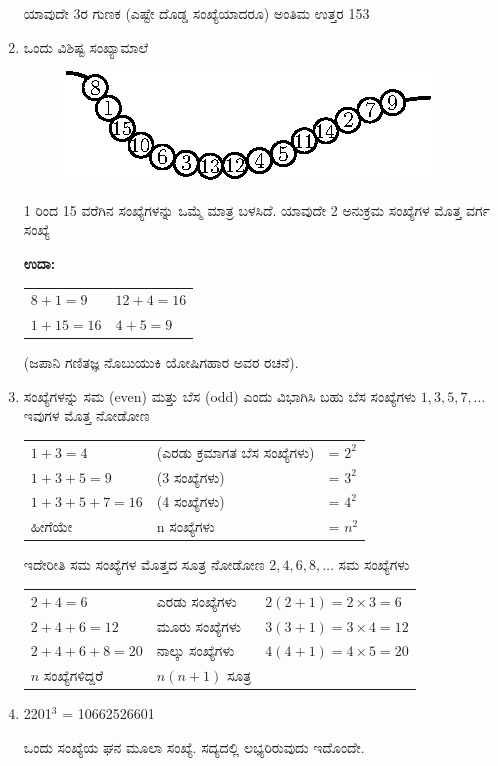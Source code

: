 \begin{enumerate}
ಯಾವುದೇ 3ರ ಗುಣಕ (ಎಷ್ಟೇ ದೊಡ್ಡ ಸಂಖ್ಯೆಯಾದರೂ) ಅಂತಿಮ ಉತ್ತರ 153

\item ಒಂದು ವಿಶಿಷ್ಟ ಸಂಖ್ಯಾಮಾಲೆ
\begin{figure}[H]
\centering
\includegraphics{images/chap1/q28.eps}
\end{figure}

1 ರಿಂದ 15 ವರೆಗಿನ ಸಂಖ್ಯೆಗಳನ್ನು ಒಮ್ಮೆ ಮಾತ್ರ ಬಳಸಿದೆ. ಯಾವುದೇ 2 ಅನುಕ್ರಮ ಸಂಖ್ಯೆಗಳ ಮೊತ್ತ ವರ್ಗ ಸಂಖ್ಯೆ

{\bf ಉದಾ:}
\begin{tabular}[t]{ll}
$8 + 1 = 9$ & $12 + 4 = 16$\\
$1 + 15 = 16$ & $4 + 5 = 9$
\end{tabular}

\hfill (ಜಪಾನಿ ಗಣಿತಜ್ಞ ನೊಬುಯುಕಿ ಯೋಷಿಗಹಾರ ಅವರ ರಚನೆ).

\item ಸಂಖ್ಯೆಗಳನ್ನು ಸಮ (even) ಮತ್ತು ಬೆಸ (odd) ಎಂದು ವಿಭಾಗಿಸಿ ಬಹು ಬೆಸ ಸಂಖ್ಯೆಗಳು $1, 3, 5, 7, \ldots$ ಇವುಗಳ ಮೊತ್ತ ನೋಡೋಣ

{\fontsize{11pt}{13pt}\selectfont
\begin{tabular}{lll}
$1 + 3 = 4$ &(ಎರಡು ಕ್ರಮಾಗತ ಬೆಸ ಸಂಖ್ಯೆಗಳು) & = $2^{2}$\\
$1 + 3 + 5 = 9$ &(3 ಸಂಖ್ಯೆಗಳು) & = $3^{2}$\\
$1 + 3 + 5 + 7 = 16$ &(4 ಸಂಖ್ಯೆಗಳು) & = $4^{2}$\\
ಹೀಗೆಯೇ & n ಸಂಖ್ಯೆಗಳು & = $n^{2}$
\end{tabular}}\relax

ಇದೇರೀತಿ ಸಮ ಸಂಖ್ಯೆಗಳ ಮೊತ್ತದ ಸೂತ್ರ ನೋಡೋಣ $2, 4, 6, 8, \ldots$ ಸಮ ಸಂಖ್ಯೆಗಳು

{\fontsize{11pt}{13pt}\selectfont
\begin{tabular}{lll}
$2 + 4= 6$ & ಎರಡು ಸಂಖ್ಯೆಗಳು & $2(2 + 1) = 2 \times 3 = 6$\\
$2 + 4 + 6 = 12$ & ಮೂರು ಸಂಖ್ಯೆಗಳು & $3(3 + 1) = 3 \times 4 = 12$\\
$2 + 4 + 6 + 8 = 20$ &ನಾಲ್ಕು ಸಂಖ್ಯೆಗಳು & $4(4 + 1) = 4 \times 5 = 20$\\
$n$ ಸಂಖ್ಯೆಗಳಿದ್ದರೆ & $n(n + 1)$ ಸೂತ್ರ &
\end{tabular}}\relax

\item 2201$^{3}$ = 10662526601

ಒಂದು ಸಂಖ್ಯೆಯ ಘನ ಮೂಲಾ ಸಂಖ್ಯೆ. ಸದ್ಯದಲ್ಲಿ ಲಭ್ಯರಿರುವುದು ಇದೊಂದೇ.
\end{enumerate}

